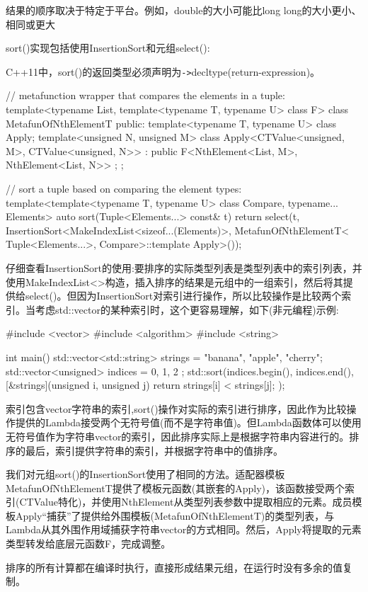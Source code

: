 \begin{notice}
结果的顺序取决于特定于平台。例如，double的大小可能比long long的大小更小、相同或更大
\end{notice}

sort()实现包括使用InsertionSort和元组select():

\begin{notice}
C++11中，sort()的返回类型必须声明为\texttt{->}decltype(return-expression)。
\end{notice}

\begin{cpp}
// metafunction wrapper that compares the elements in a tuple:
template<typename List, template<typename T, typename U> class F>
class MetafunOfNthElementT {
	public:
	template<typename T, typename U> class Apply;
	template<unsigned N, unsigned M>
	class Apply<CTValue<unsigned, M>, CTValue<unsigned, N>>
	: public F<NthElement<List, M>, NthElement<List, N>> { };
};

// sort a tuple based on comparing the element types:
template<template<typename T, typename U> class Compare,
typename... Elements>
auto sort(Tuple<Elements...> const& t)
{
	return select(t,
					InsertionSort<MakeIndexList<sizeof...(Elements)>,
									MetafunOfNthElementT<
												Tuple<Elements...>,
												Compare>::template Apply>());
}
\end{cpp}

仔细查看InsertionSort的使用:要排序的实际类型列表是类型列表中的索引列表，并使用MakeIndexList<>构造，插入排序的结果是元组中的一组索引，然后将其提供给select()。但因为InsertionSort对索引进行操作，所以比较操作是比较两个索引。当考虑std::vector的某种索引时，这个更容易理解，如下(非元编程)示例:

\begin{cpp}
#include <vector>
#include <algorithm>
#include <string>

int main()
{
	std::vector<std::string> strings = {"banana", "apple", "cherry"};
	std::vector<unsigned> indices = { 0, 1, 2 };
	std::sort(indices.begin(), indices.end(),
			[&strings](unsigned i, unsigned j) {
				return strings[i] < strings[j];
			});
}
\end{cpp}

索引包含vector字符串的索引,sort()操作对实际的索引进行排序，因此作为比较操作提供的Lambda接受两个无符号值(而不是字符串值)。但Lambda函数体可以使用无符号值作为字符串vector的索引，因此排序实际上是根据字符串内容进行的。排序的最后，索引提供字符串的索引，并根据字符串中的值排序。

我们对元组sort()的InsertionSort使用了相同的方法。适配器模板MetafunOfNthElementT提供了模板元函数(其嵌套的Apply)，该函数接受两个索引(CTValue特化)，并使用NthElement从类型列表参数中提取相应的元素。成员模板Apply“捕获”了提供给外围模板(MetafunOfNthElementT)的类型列表，与Lambda从其外围作用域捕获字符串vector的方式相同。然后，Apply将提取的元素类型转发给底层元函数F，完成调整。

排序的所有计算都在编译时执行，直接形成结果元组，在运行时没有多余的值复制。

















